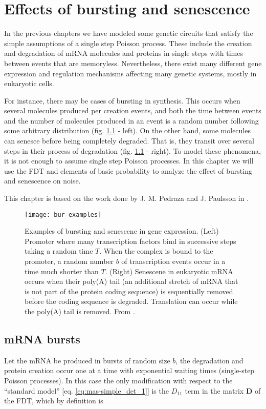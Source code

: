 \chapter{Effects of bursting and senescence}
\label{ch:bursting}

In the previous chapters we have modeled some genetic circuits that satisfy the simple assumptions of a single step Poisson process. These include the creation and degradation of mRNA molecules and proteins in single steps with times between events that are memoryless. Nevertheless, there exist many different gene expression and regulation mechanisms affecting many genetic systems, mostly in eukaryotic cells. 

For instance, there may be cases of bursting in synthesis. This occurs when several molecules produced per creation events, and both the time between events and the number of molecules produced in an event is a random number following some arbitrary distribution (fig. \ref{fig:bur-examples} - left). On the other hand, some molecules can senesce before being completely degraded. That is, they transit over several steps in their process of degradation (fig. \ref{fig:bur-examples} - right). To model these phenomena, it is not enough to assume single step Poisson processes. In this chapter we will use the FDT and elements of basic probability to analyze the effect of bursting and senescence on noise.

This chapter is based on the work done by J. M. Pedraza and J. Paulsson in \cite{pedraza08}.

\begin{figure}[H]
  \centering
  \texttt{[image: bur-examples]}
  \caption[Examples of bursting and senescence in gene expression]{\label{fig:bur-examples} Examples of bursting and senescene in gene expression. (Left) Promoter where many transcription factors bind in successive steps taking a random time $T$. When the complex is bound to the promoter, a random number $b$ of transcription events occur in a time much shorter than $T$. (Right) Senescene in eukaryotic mRNA occurs when their poly(A) tail (an additional stretch of mRNA that is not part of the protein coding sequence) is sequentially removed before the coding sequence is degraded. Translation can occur while the poly(A) tail is removed. From \cite{pedraza08}.}
\end{figure}

\section{mRNA bursts}
Let the mRNA be produced in bursts of random size $b$, the degradation and protein creation occur one at a time with exponential waiting times (single-step Poisson processes). In this case the only modification with respect to the ``standard model'' [eq. \eqref{eq:mas-simple_det_1}] is the $D_{11}$ term in the matrix $\mathbf{D}$ of the FDT, which by definition is


